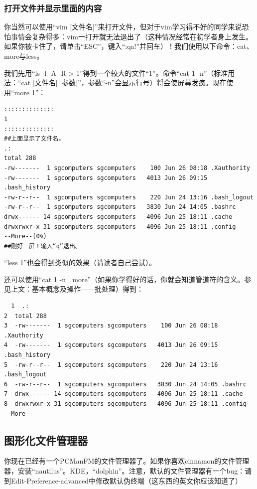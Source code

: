 \documentclass{book}
\begin{document}
\subsubsection{打开文件并显示里面的内容}
你当然可以使用“vim [文件名]”来打开文件，但对于vim学习得不好的同学来说恐怕事情会复杂得多：vim一打开就无法退出了（这种情况经常在初学者身上发生。如果你被卡住了，请单击“ESC”，键入“:qa!”并回车）！我们使用以下命令：cat、more与less。\par
我们先用“ls -l -A -R > 1”得到一个较大的文件“1”。命令“cat 1 -n”（标准用法：“cat [文件名] [参数]”，参数“-n”会显示行号）将会使屏幕发疯。现在使用“more 1”：
\begin{verbatim}
::::::::::::::
1
::::::::::::::
##上面显示了文件名。
.:
total 288
-rw-------  1 sgcomputers sgcomputers    100 Jun 26 08:18 .Xauthority
-rw-------  1 sgcomputers sgcomputers   4013 Jun 26 09:15 .bash_history
-rw-r--r--  1 sgcomputers sgcomputers    220 Jun 24 13:16 .bash_logout
-rw-r--r--  1 sgcomputers sgcomputers   3830 Jun 24 14:05 .bashrc
drwx------ 14 sgcomputers sgcomputers   4096 Jun 25 18:11 .cache
drwxrwxr-x 31 sgcomputers sgcomputers   4096 Jun 25 18:11 .config
--More--(0%)
##刚好一屏！输入“q”退出。
\end{verbatim}
“less 1”也会得到类似的效果（请读者自己尝试）。\par
还可以使用“cat 1 -n | more”（如果你学得好的话，你就会知道管道符的含义。参见上文：基本概念及操作——批处理）得到：
\begin{verbatim}
  1  .:
2  total 288
3  -rw-------  1 sgcomputers sgcomputers    100 Jun 26 08:18 .Xauthority
4  -rw-------  1 sgcomputers sgcomputers   4013 Jun 26 09:15 .bash_history
5  -rw-r--r--  1 sgcomputers sgcomputers    220 Jun 24 13:16 .bash_logout
6  -rw-r--r--  1 sgcomputers sgcomputers   3830 Jun 24 14:05 .bashrc
7  drwx------ 14 sgcomputers sgcomputers   4096 Jun 25 18:11 .cache
8  drwxrwxr-x 31 sgcomputers sgcomputers   4096 Jun 25 18:11 .config
--More--
\end{verbatim}
\subsection{图形化文件管理器}
你现在已经有一个PCManFM的文件管理器了。如果你喜欢cinnamon的文件管理器，安装“nautilus”。KDE，“dolphin”。注意，默认的文件管理器有一个bug：请到Edit-Preference-advanced中修改默认伪终端（这东西的英文你应该知道了）
\end{document}
